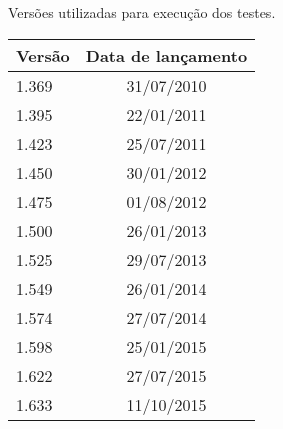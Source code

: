 \begin{quadro}[]
	\centering
	\caption{Versões utilizadas para execução dos testes.}
	\label{tab:versionTabs}
	\begin{tabular}{|l|c|}
		\hline
		\textbf{Versão} & \textbf{Data de lançamento} \\ \hline
		1.369           & 31/07/2010            \\ \hline
		1.395           & 22/01/2011            \\ \hline
		1.423           & 25/07/2011            \\ \hline
		1.450           & 30/01/2012            \\ \hline
		1.475           & 01/08/2012            \\ \hline
		1.500           & 26/01/2013            \\ \hline
		1.525           & 29/07/2013            \\ \hline
		1.549           & 26/01/2014            \\ \hline
		1.574           & 27/07/2014            \\ \hline
		1.598           & 25/01/2015            \\ \hline
		1.622           & 27/07/2015            \\ \hline
		1.633           & 11/10/2015           \\ \hline
	\end{tabular}
\end{quadro}
